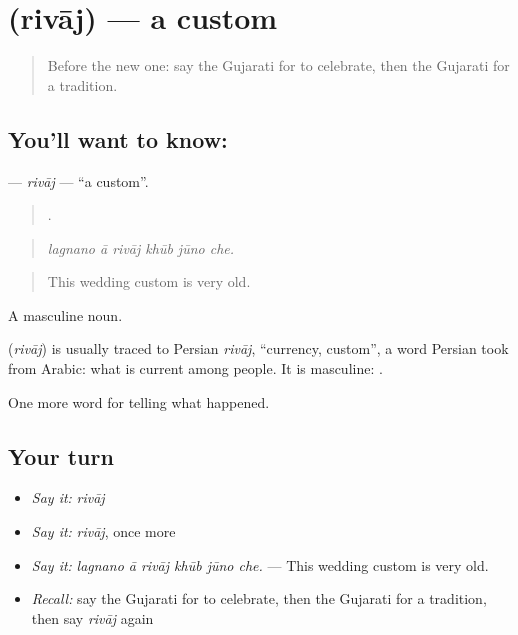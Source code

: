 \section[\texorpdfstring{\gu{રિવાજ} (rivāj)}{રિવાજ (rivāj)}]{ (rivāj) — a custom}

\label{lesson:GU-C327-rivaj}



\begin{quote}
Before the new one: say the Gujarati for to celebrate, then the Gujarati for a tradition.
\end{quote}

\subsection*{You'll want to know: }
\textbf{} — \emph{rivāj} — \textquotedblleft{}a custom\textquotedblright{}.

\begin{quote}
     .
\end{quote}

\begin{quote}
\emph{lagnano ā rivāj khūb jūno che.}
\end{quote}

\begin{quote}
This wedding custom is very old.
\end{quote}

A masculine noun.

\begin{cousinweb}
\textbf{} (\emph{rivāj}) is usually traced to Persian \emph{rivāj}, \textquotedblleft{}currency, custom\textquotedblright{}, a word Persian took from Arabic: what is current among people. It is masculine: \textbf{ }.
\end{cousinweb}

\begin{grammarlens}[title={What you've built}]
One more word for telling what happened.
\end{grammarlens}

\subsection*{Your turn}
\begin{itemize}
\raggedright
  \item \emph{Say it:} \emph{rivāj}
  \item \emph{Say it:} \emph{rivāj}, once more
  \item \emph{Say it:} \emph{lagnano ā rivāj khūb jūno che.} — This wedding custom is very old.
  \item \emph{Recall:} say the Gujarati for to celebrate, then the Gujarati for a tradition, then say \emph{rivāj} again
\end{itemize}

